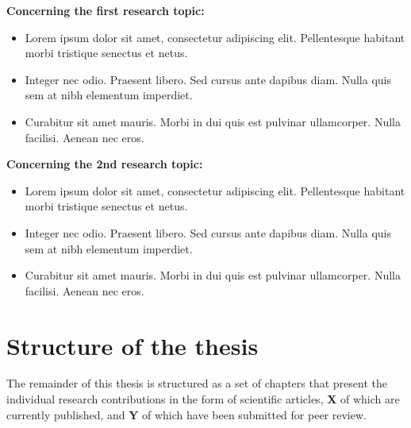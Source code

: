 \documentclass[
  a4paper,
  oneside]{ETH-thesis-template}
\begin{document}
\begin{tcolorbox}[enhanced jigsaw, breakable, opacityback=0, bottomtitle=1mm, bottomrule=.15mm, colback=white, opacitybacktitle=0.6, toprule=.15mm, colframe=quarto-callout-note-color-frame, toptitle=1mm, titlerule=0mm, title={\textbf{Summary of the chapter}}, coltitle=black, arc=.35mm, rightrule=.15mm, leftrule=.75mm, left=2mm, colbacktitle=quarto-callout-note-color!10!white]

\hfill\break
\textbf{Concerning the first research topic:}\\

\begin{itemize}
  \setlength\itemsep{0.8em}
  \item Lorem ipsum dolor sit amet, consectetur adipiscing elit. Pellentesque habitant morbi tristique senectus et netus.
  \item Integer nec odio. Praesent libero. Sed cursus ante dapibus diam. Nulla quis sem at nibh elementum imperdiet.
  \item Curabitur sit amet mauris. Morbi in dui quis est pulvinar ullamcorper. Nulla facilisi. Aenean nec eros.
\end{itemize}

\hfill\break
\textbf{Concerning the 2nd research topic:}\\

\begin{itemize}
  \setlength\itemsep{0.8em}
  \item Lorem ipsum dolor sit amet, consectetur adipiscing elit. Pellentesque habitant morbi tristique senectus et netus.
  \item Integer nec odio. Praesent libero. Sed cursus ante dapibus diam. Nulla quis sem at nibh elementum imperdiet.
  \item Curabitur sit amet mauris. Morbi in dui quis est pulvinar ullamcorper. Nulla facilisi. Aenean nec eros.
\end{itemize}

\end{tcolorbox}


\chapter{Structure of the thesis}\label{sec-struct_chap}

\newpage

The remainder of this thesis is structured as a set of chapters that
present the individual research contributions in the form of scientific
articles, \textbf{X} of which are currently published, and \textbf{Y} of
which have been submitted for peer review.
\end{document}
